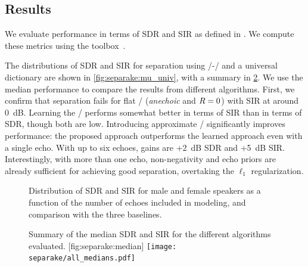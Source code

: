 \subsection{Results}
\label{sec:results}

We evaluate performance in terms of \ac{SDR} and \ac{SIR} as defined in .
We compute these metrics using the  toolbox~.

\mynewline
The distributions of \ac{SDR} and \ac{SIR} for separation using \MU/-\NMF/ and a universal dictionary are shown in \cref{fig:separake:mu_univ}, with a summary in \cref{fig:separake:median}.
We use the median performance to compare the results from different algorithms.
First, we confirm that separation fails for flat \RTFs/ (\textit{anechoic} and $R=0$) with \ac{SIR} at around 0~dB.
Learning the \RTFs/ performs somewhat better in terms of \ac{SIR} than in terms of \ac{SDR}, though both are low.
Introducing approximate \RTFs/ significantly improves performance: the proposed approach outperforms the learned approach even with a single echo.
With up to six echoes, gains are +2~dB \ac{SDR} and +5~dB \ac{SIR}.
Interestingly, with more than one echo, non-negativity and echo priors are already sufficient for achieving good separation, overtaking the $\ell_1$ regularization.


\begin{figure}[t]
    \begin{fullwidth}
    \centering
    \hfill
    \hfill
    \caption{Distribution of \ac{SDR} and \ac{SIR} for male and female speakers as a function of the number of echoes included in modeling, and comparison with the three baselines.}
    \label{fig:separake:results}
    \end{fullwidth}
\end{figure}


\begin{figure}[b]
    \begin{sidecaption}[]{
            Summary of the median \ac{SDR} and \ac{SIR} for the different algorithms evaluated.
            \label{fig:separake:median}
        }[fig:separake:median]
        \centering
        \small
        \texttt{[image: separake/all\_medians.pdf]}
    \end{sidecaption}
\end{figure}


